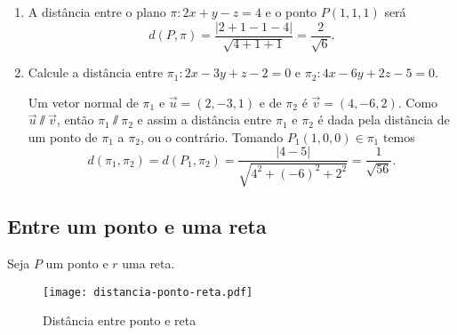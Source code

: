 \begin{exemplos}
    \begin{enumerate}
        \item A dist\^ancia entre o plano $\pi: 2x + y - z = 4$ e o ponto $P(1,1,1)$ ser\'a
        \[
            d(P,\pi) = \dfrac{|2 + 1 - 1 - 4|}{\sqrt{4 + 1 + 1}} = \dfrac{2}{\sqrt{6}}.
        \]
        \item Calcule a dist\^ancia entre $\pi_1 : 2x - 3y + z - 2 = 0$ e $\pi_2 : 4x - 6y + 2z - 5 = 0$.
        \begin{solucao}
            Um vetor normal de $\pi_1$ e $\vec{u} = (2,-3,1)$ e de $\pi_2$ \'e $\vec{v} = (4,-6,2)$. Como $\vec{u}\varparallel\vec{v}$, ent\~ao $\pi_1\varparallel\pi_2$ e assim a dist\^ancia entre $\pi_1$ e $\pi_2$ \'e dada pela dist\^ancia de um ponto de $\pi_1$ a $\pi_2$, ou o contr\'ario. Tomando $P_1(1,0,0)\in\pi_1$ temos
            \[
                d(\pi_1,\pi_2) = d(P_1,\pi_2) = \dfrac{|4-5|}{\sqrt{4^2 + (-6)^2 + 2^2}} = \dfrac{1}{\sqrt{56}}.
            \]
        \end{solucao}
    \end{enumerate}
\end{exemplos}


\subsection{Entre um ponto e uma reta} %
\label{sub:entre_um_ponto_e_uma_reta}

Seja $P$ um ponto e $r$ uma reta.
\begin{figure}[h]
    \centering
    \caption{Dist\^ancia entre ponto e reta}
    \texttt{[image: distancia-ponto-reta.pdf]}

\end{figure}

